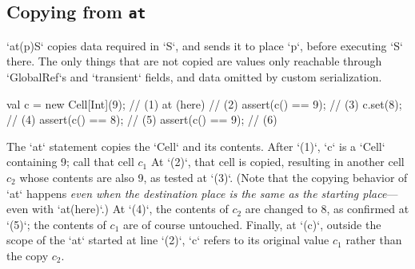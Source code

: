 


\subsection{Copying from {\tt at} }

\xcd`at(p)S` copies data required in \xcd`S`, and sends it
to place \xcd`p`, before executing \xcd`S` there. The only things that are not
copied are values only reachable through \xcd`GlobalRef`s and \xcd`transient`
fields, and data omitted by custom serialization.    

\begin{ex}

% 
\begin{xten}
val c = new Cell[Int](9); // (1)
at (here) {               // (2) 
   assert(c() == 9);      // (3)
   c.set(8);              // (4)
   assert(c() == 8);      // (5)
}
assert(c() == 9);         // (6)
\end{xten}


The \xcd`at` statement copies the \xcd`Cell` and its contents.  
After \xcd`(1)`, \xcd`c` is a \xcd`Cell` containing 9; call that cell {$c_1$}
At \xcd`(2)`, that cell is copied, resulting in another cell {$c_2$} whose
contents are also 9, as tested at \xcd`(3)`.
(Note that the copying behavior of \xcd`at` happens {\em even when the
destination place is the same as the starting place}--- even with
\xcd`at(here)`.)
At \xcd`(4)`, the contents of {$c_2$} are changed to 8, as confirmed at \xcd`(5)`; the contents of
{$c_1$} are of course untouched.    Finally, at \xcd`(c)`, outside the scope
of the \xcd`at` started at line \xcd`(2)`, \xcd`c` refers to its original
value {$c_1$} rather than the copy {$c_2$}.  
\end{ex}

